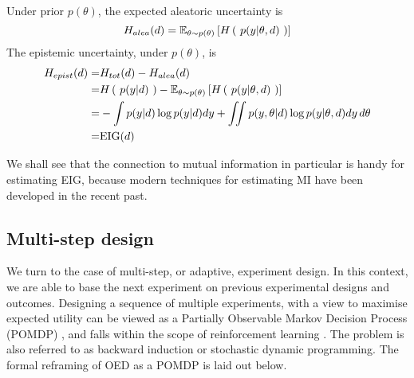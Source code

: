 \begin{enumerate}
Under prior $p(\theta)$, the expected aleatoric uncertainty is
\begin{equation}
	H_{alea}(d) = \mathbb{E}_{\theta \sim p(\theta)}\left[ H\left(\ p(y|\theta, d)\ \right) \right]
\end{equation}
The epistemic uncertainty, under $p(\theta)$, is
\begin{align}
	H_{epist}(d) =& H_{tot}(d) - H_{alea}(d)\\
	=&H\left(\ p(y|d)\ \right) - \mathbb{E}_{\theta \sim p(\theta)}\left[ H\left(\ p(y|\theta, d)\ \right) \right] \\
	=&-\int p(y|d)\log p(y|d)dy + \iint p(y, \theta | d)\log p(y|\theta, d) dy \, d\theta\\
	=& \text{EIG}(d)
\end{align}

\end{enumerate}
We shall see that the connection to mutual information in particular is handy for estimating EIG, because modern techniques for estimating MI have been developed in the recent past.


\subsection{Multi-step design}
We turn to the case of multi-step, or adaptive, experiment design. In this context, we are able to base the next experiment on previous experimental designs and outcomes. Designing a sequence of multiple experiments, with a view to maximise expected utility can be viewed as a Partially Observable Markov Decision Process (POMDP) \cite{marchant2014}, and falls within the scope of reinforcement learning \cite{pang2018}. The problem is also referred to as backward induction or stochastic dynamic programming. The formal reframing of OED as a POMDP is laid out below.

